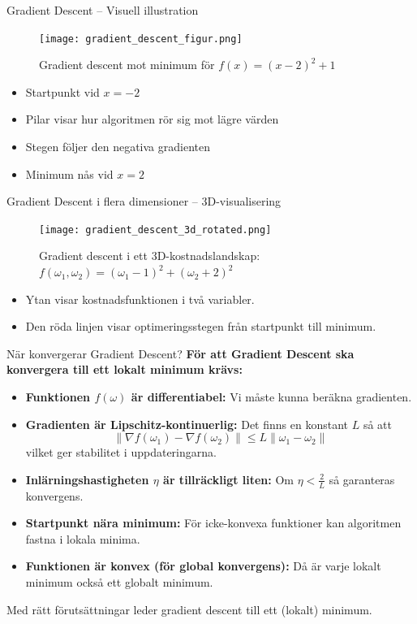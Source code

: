 \documentclass[10pt,english]{beamer}
\begin{document}
\begin{frame}{Gradient Descent – Visuell illustration}
    \begin{figure}[htbp]
        \centering
        \texttt{[image: gradient\_descent\_figur.png]}
        \caption*{Gradient descent mot minimum för $f(x) = (x - 2)^2 + 1$}
    \end{figure}

    \begin{itemize}
        \item Startpunkt vid $x=-2$
        \item Pilar visar hur algoritmen rör sig mot lägre värden
        \item Stegen följer den negativa gradienten
        \item Minimum nås vid $x = 2$
    \end{itemize}
\end{frame}

\begin{frame}{Gradient Descent i flera dimensioner – 3D-visualisering}
    \begin{figure}[htbp]
        \centering
        \texttt{[image: gradient\_descent\_3d\_rotated.png]}
        \caption*{Gradient descent i ett 3D-kostnadslandskap: $f(\omega_1, \omega_2) = (\omega_1 - 1)^2 + (\omega_2 + 2)^2$}
    \end{figure}

    \begin{itemize}
        \item Ytan visar kostnadsfunktionen i två variabler.
        \item Den röda linjen visar optimeringsstegen från startpunkt till minimum.
    \end{itemize}
\end{frame}

\begin{frame}{När konvergerar Gradient Descent?}
    \textbf{För att Gradient Descent ska konvergera till ett lokalt minimum krävs:}
    \begin{itemize}
        \item \textbf{Funktionen $f(\omega)$ är differentiabel:} Vi måste kunna beräkna gradienten.
        \item \textbf{Gradienten är Lipschitz-kontinuerlig:} Det finns en konstant $L$ så att
        \[
        \|\nabla f(\omega_1) - \nabla f(\omega_2)\| \leq L \|\omega_1 - \omega_2\|
        \]
        vilket ger stabilitet i uppdateringarna.
        \item \textbf{Inlärningshastigheten $\eta$ är tillräckligt liten:} Om $\eta < \frac{2}{L}$ så garanteras konvergens.
        \item \textbf{Startpunkt nära minimum:} För icke-konvexa funktioner kan algoritmen fastna i lokala minima.
        \item \textbf{Funktionen är konvex (för global konvergens):} Då är varje lokalt minimum också ett globalt minimum.
    \end{itemize}

    Med rätt förutsättningar leder gradient descent till ett (lokalt) minimum.
\end{frame}
\end{document}
